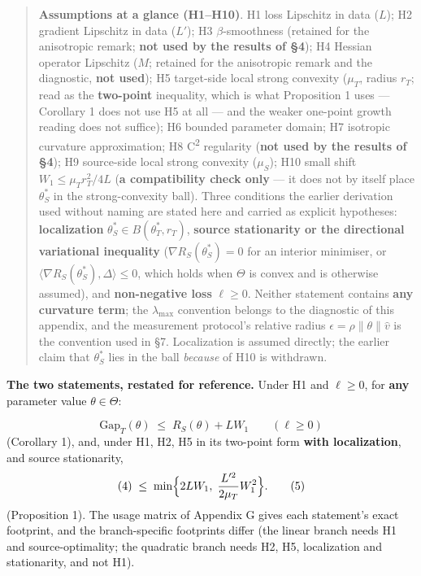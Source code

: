 \documentclass[pdflatex,sn-mathphys-ay]{sn-jnl}
\begin{document}
\begin{quote}
\textbf{Assumptions at a glance (H1--H10)}. H1 loss Lipschitz in data ($L$); H2 gradient Lipschitz in data ($L'$); H3 \ensuremath{\beta}-smoothness (retained for the anisotropic remark; \textbf{not used by the results of \S{}4}); H4 Hessian operator Lipschitz ($M$; retained for the anisotropic remark and the diagnostic, \textbf{not used}); H5 target-side local strong convexity ($\mu_T$, radius $r_T$; read as the \textbf{two-point} inequality, which is what Proposition 1 uses --- Corollary 1 does not use H5 at all --- and the weaker one-point growth reading does not suffice); H6 bounded parameter domain; H7 isotropic curvature approximation; H8 C\textsuperscript{2} regularity (\textbf{not used by the results of \S{}4}); H9 source-side local strong convexity ($\mu_S$); H10 small shift $W_1 \le \mu_T r_T^2/4L$ (\textbf{a compatibility check only} --- it does not by itself place $\theta^*_S$ in the strong-convexity ball). Three conditions the earlier derivation used without naming are stated here and carried as explicit hypotheses: \textbf{localization} $\theta^*_S\in B(\theta^*_T,r_T)$, \textbf{source stationarity or the directional variational inequality} ($\nabla R_S(\theta^*_S)=0$ for an interior minimiser, or $\langle\nabla R_S(\theta^*_S),\Delta\rangle\le0$, which holds when $\Theta$ is convex and is otherwise assumed), and \textbf{non-negative loss} $\ell\ge0$. Neither statement contains \textbf{any curvature term}; the $\lambda_{\max}$ convention belongs to the diagnostic of this appendix, and the measurement protocol's relative radius $\epsilon = \rho\|\theta\|\hat v$ is the convention used in \S{}7. Localization is assumed directly; the earlier claim that $\theta^*_S$ lies in the ball \emph{because} of H10 is withdrawn.
\end{quote}

\textbf{The two statements, restated for reference.} Under H1 and $\ell\ge0$, for \textbf{any} parameter value $\theta\in\Theta$:

\[\mathrm{Gap}_T(\theta) \;\le\; {R}_S(\theta) + L W_1 \qquad (\ell\ge0) \tag{4}\] (Corollary 1), and, under H1, H2, H5 in its two-point form \textbf{with localization}, and source stationarity, \[(4) \;\le\; \min\Bigl\{2LW_1,\; \frac{L'^2}{2\mu_T}W_1^2\Bigr\}. \tag{5}\] (Proposition 1). The usage matrix of Appendix G gives each statement's exact footprint, and the branch-specific footprints differ (the linear branch needs H1 and source-optimality; the quadratic branch needs H2, H5, localization and stationarity, and not H1).
\end{document}
